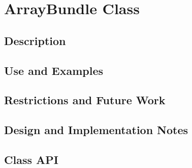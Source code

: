 \documentclass[english]{article}
\begin{document}
\section{ArrayBundle Class}
\subsection{Description}

%
%
\subsection{Use and Examples}



\subsection{Restrictions and Future Work}

\subsection{Design and Implementation Notes}

\subsection{Class API}

%
%
%
\end{document}
